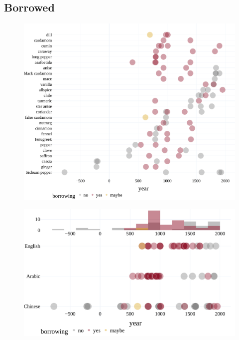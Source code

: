 \subsection{Borrowed}



\begin{figure}[!ht]
  \centering
  \includegraphics[width=\linewidth]{imgs/plots/borrowing.pdf}
  \caption{}
  \label{fig:borrowing}
\end{figure}

\begin{figure}[!ht]
  \centering
  \includegraphics[width=\linewidth]{imgs/plots/borrowing_compact.pdf}
  \caption{}
  \label{fig:borrowing_compact}
\end{figure}


